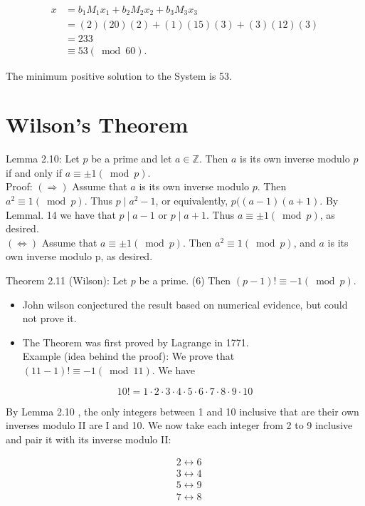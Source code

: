 \documentclass[10pt]{article}
\begin{document}
$$
\begin{aligned}
x & =b_{1} M_{1} x_{1}+b_{2} M_{2} x_{2}+b_{3} M_{3} x_{3} \\
& =(2)(20)(2)+(1)(15)(3)+(3)(12)(3) \\
& =233 \\
& \equiv 53(\bmod 60) .
\end{aligned}
$$

The minimum positive solution to the System is 53.

\section*{Wilson's Theorem}
Lemma 2.10: Let $p$ be a prime and let $a \in \mathbb{Z}$. Then $a$ is its own inverse modulo $p$ if and only if $a \equiv \pm 1(\bmod p)$.\\
Proof: $(\Rightarrow)$ Assume that $a$ is its own inverse modulo $p$. Then $a^{2} \equiv 1(\bmod p)$. Thus $p \mid a^{2}-1$, or equivalently, $p((a-1)(a+1)$. By Lemmal. 14 we have that $p \mid a-1$ or $p \mid a+1$. Thus $a \equiv \pm 1(\bmod p)$, as desired.\\
$(\Leftrightarrow)$ Assume that $a \equiv \pm 1(\bmod p)$. Then $a^{2} \equiv 1(\bmod p)$, and $a$ is its own inverse modulo p, as desired.

Theorem 2.11 (Wilson): Let $p$ be a prime. (6) Then $(p-1)!\equiv-1(\bmod p)$.

\begin{itemize}
  \item John wilson conjectured the result based on numerical evidence, but could not prove it.
  \item The Theorem was first proved by Lagrange in 1771.\\
Example (idea behind the proof): We prove that $(11-1)!\equiv-1(\bmod 11)$. We have
\end{itemize}

$$
10!=1 \cdot 2 \cdot 3 \cdot 4 \cdot 5 \cdot 6 \cdot 7 \cdot 8 \cdot 9 \cdot 10
$$

By Lemma 2.10 , the only integers between 1 and 10 inclusive that are their own inverses modulo II are I and 10. We now take each integer from 2 to 9 inclusive and pair it with its inverse modulo II:

$$
\begin{aligned}
& 2 \leftrightarrow 6 \\
& 3 \leftrightarrow 4 \\
& 5 \leftrightarrow 9 \\
& 7 \leftrightarrow 8
\end{aligned}
$$
\end{document}
